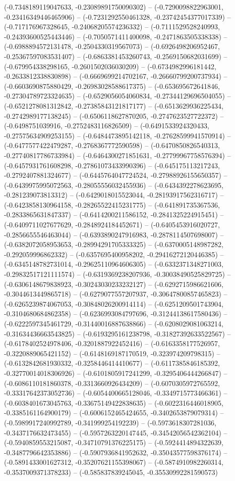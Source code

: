 (-0.7348189119047633, -0.23089891750090302) -- (-0.7290098822963001, -0.23416349446465906) -- (-0.7231292550461328, -0.23742454377017339) -- (-0.717176967328645, -0.24068205574236332) -- (-0.7111529528240993, -0.24393600525443446) -- (-0.7050571411400098, -0.2471863505338338) -- (-0.6988894572131478, -0.2504330319567073) -- (-0.6926498206952467, -0.25367597083531407) -- (-0.6863381453260743, -0.2569150682031699) -- (-0.679954338298165, -0.2601502036030209) -- (-0.6734982996181442, -0.2633812338830898) -- (-0.6669699214702167, -0.26660799200737934) -- (-0.6603690875880429, -0.26983028588617375) -- (-0.653695672641846, -0.27304789723324635) -- (-0.6529056054060834, -0.27344129696504055) -- (-0.6521278081312842, -0.27385843121817177) -- (-0.6513629936225434, -0.2742989177138245) -- (-0.6506118627870205, -0.2747623527722372) -- (-0.6498751039916, -0.2752483116826509) -- (-0.6491533924320433, -0.27575634909253155) -- (-0.6484473895142118, -0.27628599941570914) -- (-0.6477577422479287, -0.2768367772590598) -- (-0.6470850826540313, -0.27740817786733984) -- (-0.6464300271851631, -0.27799967758576394) -- (-0.6457931761608298, -0.27861073433990396) -- (-0.645175113217243, -0.2792407881324677) -- (-0.6445764047724524, -0.27988926155650357) -- (-0.6439975995072563, -0.28055556032455936) -- (-0.6434392278623695, -0.281239073813312) -- (-0.6429018015523044, -0.28193917562316717) -- (-0.6423858130964158, -0.28265522415231775) -- (-0.641891735367536, -0.2833865631847337) -- (-0.6414200211586152, -0.2841325224915451) -- (-0.6409711027677629, -0.2848924184452671) -- (-0.6405453916020727, -0.2856655546463044) -- (-0.6393890247916983, -0.2878114507698007) -- (-0.6382072058953653, -0.28994291705333325) -- (-0.6370005148987282, -0.292059996862332) -- (-0.6357695400958202, -0.29416272120446385) -- (-0.6345148782731014, -0.29625110964606305) -- (-0.6332371348271003, -0.29832517121111574) -- (-0.6319369238207936, -0.30038490525829725) -- (-0.6306148679838923, -0.30243030233232127) -- (-0.6292715986621606, -0.3044613449865718) -- (-0.6279077557207937, -0.30647800857465823) -- (-0.6265239874067053, -0.30848026200914114) -- (-0.6251209501743904, -0.3104680684862358) -- (-0.6236993084797696, -0.31244138617580436) -- (-0.6222597345461729, -0.31440016887638866) -- (-0.6208029081063214, -0.31634436663543825) -- (-0.6193295161238798, -0.31827392633522567) -- (-0.6178402524978406, -0.3201887922452416) -- (-0.6163358177526957, -0.3220889065421152) -- (-0.6148169187170519, -0.323974209798315) -- (-0.6132842681930332, -0.3258446414410677) -- (-0.6117385846185392, -0.32770014018306926) -- (-0.6101805917241299, -0.3295406444266847) -- (-0.6086110181860378, -0.3313660926434209) -- (-0.6070305972765592, -0.33317642373052736) -- (-0.6054400665128046, -0.3349715773466361) -- (-0.6038401673045763, -0.33675149422838635) -- (-0.6022316446018905, -0.3385161164900179) -- (-0.6006152465424655, -0.3402653879079314) -- (-0.5989917240992789, -0.341999254192239) -- (-0.5973618307281036, -0.3437176632473455) -- (-0.5957263220147445, -0.34542056542362104) -- (-0.5940859553215087, -0.34710791376225175) -- (-0.5924414894322639, -0.3487796642353886) -- (-0.5907936841952632, -0.35043577598376174) -- (-0.5891433001627312, -0.35207621155398067) -- (-0.5874910982260314, -0.3537009371378233) -- (-0.585837839245045, -0.35530992281590573) 